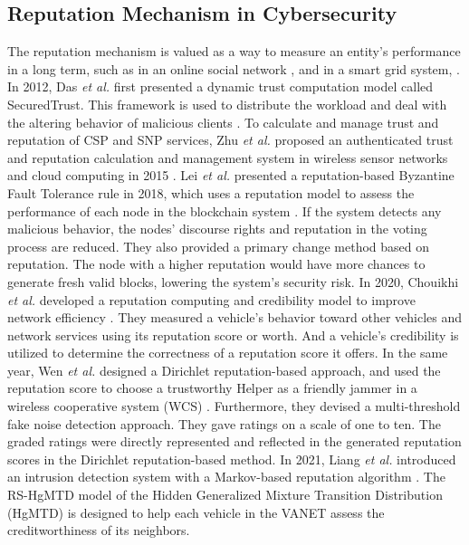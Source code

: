 \documentclass[lettersize,journal]{IEEEtran}
\begin{document}
\subsection{Reputation Mechanism in Cybersecurity}
The reputation mechanism is valued as a way to measure an entity's performance in a long term, such as in an online social network \cite{ref_27_reputation}, and in a smart grid system, \cite{ref_41_reputation, ref_44_reputation}.
In 2012, Das \textit{et al.} first presented a dynamic trust computation model called SecuredTrust. This framework is used to distribute the workload and deal with the altering behavior of malicious clients \cite{ref_48_reputation}.
To calculate and manage trust and reputation of CSP and SNP services, Zhu \textit{et al.} proposed an authenticated trust and reputation calculation and management system in wireless sensor networks and cloud computing in 2015 \cite{ref_47_reputation}.
Lei \textit{et al.} presented a reputation-based Byzantine Fault Tolerance rule in 2018, which uses a reputation model to assess the performance of each node in the blockchain system \cite{ref_25_reputation}. If the system detects any malicious behavior, the nodes' discourse rights and reputation in the voting process are reduced. They also provided a primary change method based on reputation. The node with a higher reputation would have more chances to generate fresh valid blocks, lowering the system's security risk.
In 2020, Chouikhi \textit{et al.} developed a reputation computing and credibility model to improve network efficiency \cite{ref_23_reputation}. They measured a vehicle's behavior toward other vehicles and network services using its reputation score or worth. And a vehicle's credibility is utilized to determine the correctness of a reputation score it offers.
In the same year, Wen \textit{et al.} designed a Dirichlet reputation-based approach, and used the reputation score to choose a trustworthy Helper as a friendly jammer in a wireless cooperative system (WCS) \cite{ref_24_reputation}. Furthermore, they devised a multi-threshold fake noise detection approach. They gave ratings on a scale of one to ten. The graded ratings were directly represented and reflected in the generated reputation scores in the Dirichlet reputation-based method.
In 2021, Liang \textit{et al.} introduced an intrusion detection system with a Markov-based reputation algorithm \cite{ref_46_reputation}. The RS-HgMTD model of the Hidden Generalized Mixture Transition Distribution (HgMTD) is designed to help each vehicle in the VANET assess the creditworthiness of its neighbors.
\end{document}
